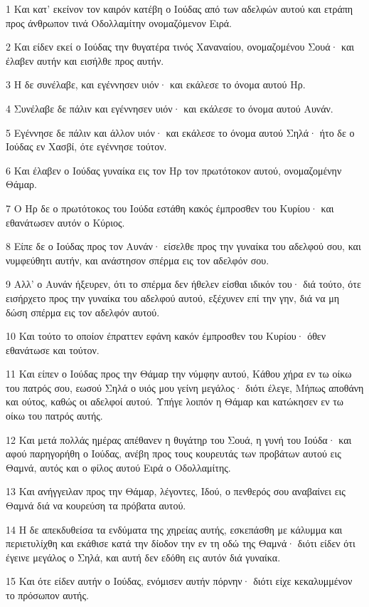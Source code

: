 \par 1 Και κατ' εκείνον τον καιρόν κατέβη ο Ιούδας από των αδελφών αυτού και ετράπη προς άνθρωπον τινά Οδολλαμίτην ονομαζόμενον Ειρά.
\par 2 Και είδεν εκεί ο Ιούδας την θυγατέρα τινός Χαναναίου, ονομαζομένου Σουά· και έλαβεν αυτήν και εισήλθε προς αυτήν.
\par 3 Η δε συνέλαβε, και εγέννησεν υιόν· και εκάλεσε το όνομα αυτού Ηρ.
\par 4 Συνέλαβε δε πάλιν και εγέννησεν υιόν· και εκάλεσε το όνομα αυτού Αυνάν.
\par 5 Εγέννησε δε πάλιν και άλλον υιόν· και εκάλεσε το όνομα αυτού Σηλά· ήτο δε ο Ιούδας εν Χασβί, ότε εγέννησε τούτον.
\par 6 Και έλαβεν ο Ιούδας γυναίκα εις τον Ηρ τον πρωτότοκον αυτού, ονομαζομένην Θάμαρ.
\par 7 Ο Ηρ δε ο πρωτότοκος του Ιούδα εστάθη κακός έμπροσθεν του Κυρίου· και εθανάτωσεν αυτόν ο Κύριος.
\par 8 Είπε δε ο Ιούδας προς τον Αυνάν· είσελθε προς την γυναίκα του αδελφού σου, και νυμφεύθητι αυτήν, και ανάστησον σπέρμα εις τον αδελφόν σου.
\par 9 Αλλ' ο Αυνάν ήξευρεν, ότι το σπέρμα δεν ήθελεν είσθαι ιδικόν του· διά τούτο, ότε εισήρχετο προς την γυναίκα του αδελφού αυτού, εξέχυνεν επί την γην, διά να μη δώση σπέρμα εις τον αδελφόν αυτού.
\par 10 Και τούτο το οποίον έπραττεν εφάνη κακόν έμπροσθεν του Κυρίου· όθεν εθανάτωσε και τούτον.
\par 11 Και είπεν ο Ιούδας προς την Θάμαρ την νύμφην αυτού, Κάθου χήρα εν τω οίκω του πατρός σου, εωσού Σηλά ο υιός μου γείνη μεγάλος· διότι έλεγε, Μήπως αποθάνη και ούτος, καθώς οι αδελφοί αυτού. Υπήγε λοιπόν η Θάμαρ και κατώκησεν εν τω οίκω του πατρός αυτής.
\par 12 Και μετά πολλάς ημέρας απέθανεν η θυγάτηρ του Σουά, η γυνή του Ιούδα· και αφού παρηγορήθη ο Ιούδας, ανέβη προς τους κουρευτάς των προβάτων αυτού εις Θαμνά, αυτός και ο φίλος αυτού Ειρά ο Οδολλαμίτης.
\par 13 Και ανήγγειλαν προς την Θάμαρ, λέγοντες, Ιδού, ο πενθερός σου αναβαίνει εις Θαμνά διά να κουρεύση τα πρόβατα αυτού.
\par 14 Η δε απεκδυθείσα τα ενδύματα της χηρείας αυτής, εσκεπάσθη με κάλυμμα και περιετυλίχθη και εκάθισε κατά την δίοδον την εν τη οδώ της Θαμνά· διότι είδεν ότι έγεινε μεγάλος ο Σηλά, και αυτή δεν εδόθη εις αυτόν διά γυναίκα.
\par 15 Και ότε είδεν αυτήν ο Ιούδας, ενόμισεν αυτήν πόρνην· διότι είχε κεκαλυμμένον το πρόσωπον αυτής.
